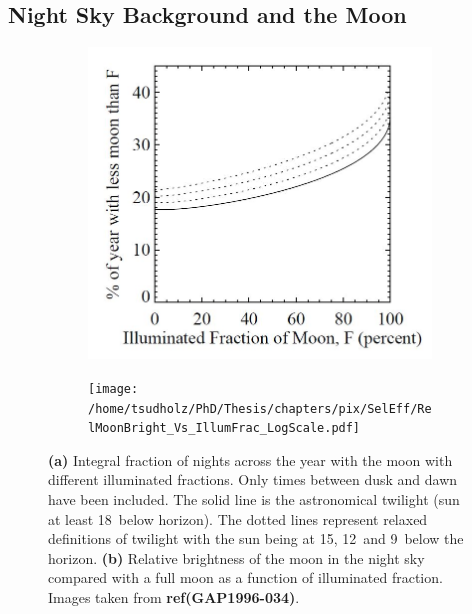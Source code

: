 \subsection{Night Sky Background and the Moon}

\begin{figure}
\centering
\begin{subfigure}[b]{0.60\textwidth}
\includegraphics[width=\textwidth]{chapters/pix/SelEff/IlluminatedMoonFrac_Twilight.JPG}
\caption{}\label{fig:MoonYearlyFrac}
\end{subfigure}
\hspace*{3mm}
\begin{subfigure}[b]{0.90\textwidth}
\texttt{[image: /home/tsudholz/PhD/Thesis/chapters/pix/SelEff/RelMoonBright\_Vs\_IllumFrac\_LogScale.pdf]}
\caption{}\label{fig:MoonIllumFrac}
\end{subfigure}
\caption{\textbf{(a)} Integral fraction of nights across the year with the moon with different illuminated fractions. Only times between dusk and dawn have been included. The solid line is the astronomical twilight (sun at least 18\textdegree \ below horizon). The dotted lines represent relaxed definitions of twilight with the sun being at 15\textdegree , 12\textdegree \ and 9\textdegree \ below the horizon. \textbf{(b)} Relative brightness of the moon in the night sky compared with a full moon as a function of illuminated fraction. Images taken from \textbf{ref{(GAP1996-034)}}. } 
\end{figure}

